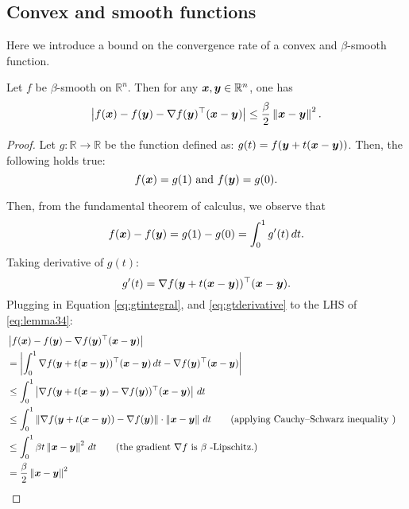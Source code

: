 \documentclass{article}
\begin{document}
\subsection{Convex and smooth functions}

Here we introduce a bound on the convergence rate of a convex and $\beta$-smooth function.

\begin{lemma}\label{lemma:smooth-sandwich}
Let $f$ be $\beta$-smooth on $\mathbb{R}^n$. Then for any ${\bm{x}},{\bm{y}} \in \mathbb{R}^n$, one has
\begin{equation} \label{eq:lemma34}
	\left| f({\bm{x}}) - f({\bm{y}}) - \nabla f({\bm{y}})^\top ({\bm{x}}-{\bm{y}}) \right| \leq \frac{\beta}{2} \left\|{\bm{x}}-{\bm{y}}\right\|^2.
\end{equation}
\end{lemma}
\begin{proof} Let $g: \mathbb{R}\to \mathbb{R}$ be the function defined as: $g(t) = f({\bm{y}}+t({\bm{x}}-{\bm{y}}))$. Then, the following holds true:
\[
    f({\bm{x}})=g(1)  \text{ and }  f({\bm{y}}) = g(0).
\]

Then, from the fundamental theorem of calculus, we observe that
\begin{equation} \label{eq:gtintegral}
    f({\bm{x}}) - f({\bm{y}}) = g(1) - g(0) = \int_{0}^{1}g'(t) \, dt .
\end{equation}
Taking derivative of $g(t):$
\begin{equation} \label{eq:gtderivative}
    g'(t) = \nabla f({\bm{y}}+t({\bm{x}}-{\bm{y}}))^\top ({\bm{x}}-{\bm{y}}).
\end{equation}
Plugging in Equation \ref{eq:gtintegral}, and \ref{eq:gtderivative} to the LHS of \ref{eq:lemma34}:
\begin{align*}
	& \left| f({\bm{x}}) - f({\bm{y}}) - \nabla f({\bm{y}})^\top ({\bm{x}}-{\bm{y}}) \right| &\\
	&= \left| \int_{0}^{1} \nabla f({\bm{y}}+t({\bm{x}}-{\bm{y}}))^\top ({\bm{x}}-{\bm{y}}) \, dt - \nabla f({\bm{y}})^\top ({\bm{x}}-{\bm{y}}) \right| \\
	&\leq \int_{0}^{1} \left| \nabla f({\bm{y}}+t({\bm{x}}-{\bm{y}})-\nabla f({\bm{y}}))^\top ({\bm{x}}-{\bm{y}}) \right| \, dt \\
	&\leq \int_{0}^{1} \left\|\nabla f({\bm{y}}+t({\bm{x}}-{\bm{y}}))-\nabla f({\bm{y}})\right\| \cdot \left\|{\bm{x}}-{\bm{y}}\right\|  \, dt \tag{applying Cauchy–Schwarz inequality  } \\
	&\leq \int_{0}^{1} \beta t\left\|{\bm{x}}-{\bm{y}}\right\|^2 \, dt \tag{the gradient $\nabla f$ is $\beta$  -Lipschitz.} \\
	&= \frac{\beta}{2}\left\|{\bm{x}}-{\bm{y}}\right\|^2
\end{align*}{}
\end{proof}
\end{document}
